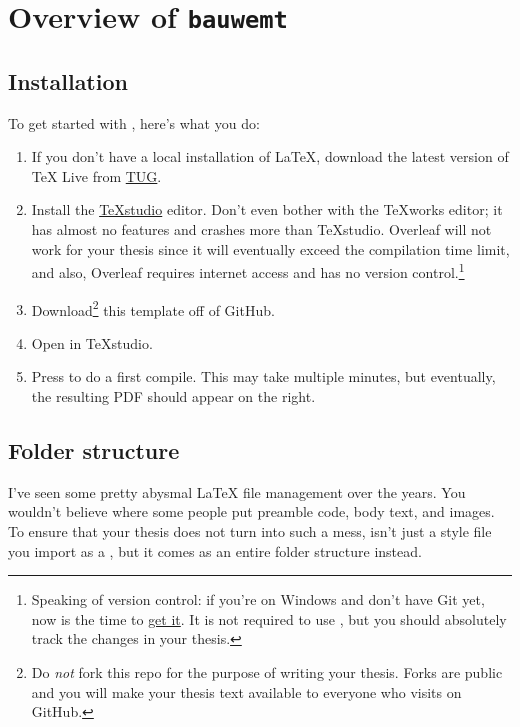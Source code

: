\chapter{Overview of \texttt{bauwemt}}\label{chap:bauwemt}

\section{Installation}
To get started with \repo, here's what you do:
\begin{enumerate}
	\item If you don't have a local installation of \LaTeX{}, download the latest version of TeX Live from \href{https://www.tug.org/texlive/}{TUG}.
	
	\item Install the \href{https://www.texstudio.org/}{TeXstudio} editor. Don't even bother with the TeXworks editor; it has almost no features and crashes more than TeXstudio. Overleaf will not work for your thesis since it will eventually exceed the compilation time limit, and also, Overleaf requires internet access and has no version control.\footnote{Speaking of version control: if you're on Windows and don't have Git yet, now is the time to \href{https://git-scm.com/downloads}{get it}. It is not required to use \repo, but you should absolutely track the changes in your thesis.}
	
	\item Download\footnote{Do \emph{not} fork this repo for the purpose of writing your thesis. Forks are public and you will make your thesis text available to everyone who visits \repo on GitHub.} this template off of GitHub.
	
	\item Open  in TeXstudio.
	
	\item Press  to do a first compile. This may take multiple minutes, but eventually, the resulting PDF should appear on the right.
\end{enumerate}

\section{Folder structure}
I've seen some pretty abysmal \LaTeX{} file management over the years. You wouldn't believe where some people put preamble code, body text, and images. To ensure that your thesis does not turn into such a mess, \repo isn't just a style file you import as a , but it comes as an entire folder structure instead.

